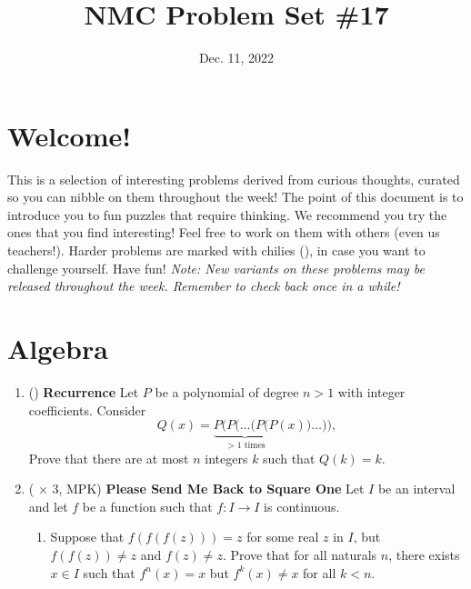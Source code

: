 \documentclass[11pt]{scrartcl}
\begin{document}
\title{NMC Problem Set \#17} %
\date{Dec. 11, 2022} %
\maketitle

\section*{Welcome!}

This is a selection of interesting problems derived from curious thoughts, curated so you can nibble on them throughout the week! The point of this document is to introduce you to fun puzzles that require thinking. We recommend you try the ones that you find interesting! Feel free to work on them with others (even us teachers!). Harder problems are marked with chilies (\fullchili), in case you want to challenge yourself.
\newline\newline
Have fun! \textit{Note: New variants on these problems may be released throughout the week. Remember to check back once in a while!}
    
\section{Algebra}
\begin{enumerate}[label=\textbf{A\arabic*}.]
    \item (\fullchili) \textbf{Recurrence} \newline
    Let $P$ be a polynomial of degree $n > 1$ with integer coefficients. Consider
    \[ Q(x) = \underbrace{P(P(\dots(P(P}_{>1 \text{ times}}(x))\dots)), \]
    Prove that there are at most $n$ integers $k$ such that $Q(k) = k$.

    \item (\fullchili \hspace{1pt} $\times$ 3, MPK) \textbf{Please Send Me Back to Square One} \newline
    Let $I$ be an interval and let $f$ be a function such that $f : I \to I$ is continuous.
    \begin{enumerate}
        \item Suppose that $f(f(f(z))) = z$ for some real $z$ in $I$, but $f(f(z)) \neq z$ and $f(z) \neq z$. Prove that for all naturals $n$, there exists $x \in I$ such that $f^n(x) = x$ but $f^k(x) \neq x$ for all $k < n$.
    \end{enumerate}
    
\end{enumerate}
\end{document}
